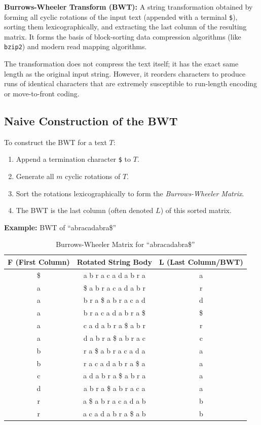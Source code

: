 \begin{important}
    \textbf{Burrows-Wheeler Transform (BWT):} A string transformation obtained by forming all cyclic rotations of the input text (appended with a terminal \verb|$|), sorting them lexicographically, and extracting the last column of the resulting matrix. It forms the basis of block-sorting data compression algorithms (like \texttt{bzip2}) and modern read mapping algorithms.
\end{important}

The transformation does not compress the text itself; it has the exact same length as the original input string. However, it reorders characters to produce runs of identical characters that are extremely susceptible to run-length encoding or move-to-front coding.

\subsection{Naive Construction of the BWT}
To construct the BWT for a text \( T \):
\begin{enumerate}
    \item Append a termination character \verb|$| to \( T \).
    \item Generate all \( m \) cyclic rotations of \( T \).
    \item Sort the rotations lexicographically to form the \textit{Burrows-Wheeler Matrix}.
    \item The BWT is the last column (often denoted \( L \)) of this sorted matrix.
\end{enumerate}

\textbf{Example:} BWT of ``abracadabra\$''
\begin{table}[ht]
    \centering
    \begin{tabular}{| c | c | c |} %
        \toprule
        \textbf{F (First Column)} & \textbf{Rotated String Body} & \textbf{L (Last Column/BWT)} \\
        \midrule
        \$ & a b r a c a d a b r a & a \\
        a  & \$ a b r a c a d a b r & r \\
        a  & b r a \$ a b r a c a d & d \\
        a  & b r a c a d a b r a \$ & \$ \\
        a  & c a d a b r a \$ a b r & r \\
        a  & d a b r a \$ a b r a c & c \\
        b  & r a \$ a b r a c a d a & a \\
        b  & r a c a d a b r a \$ a & a \\
        c  & a d a b r a \$ a b r a & a \\
        d  & a b r a \$ a b r a c a & a \\
        r  & a \$ a b r a c a d a b & b \\
        r  & a c a d a b r a \$ a b & b \\
        \bottomrule
    \end{tabular}
    \caption*{Burrows-Wheeler Matrix for ``abracadabra\$''}
\end{table}

